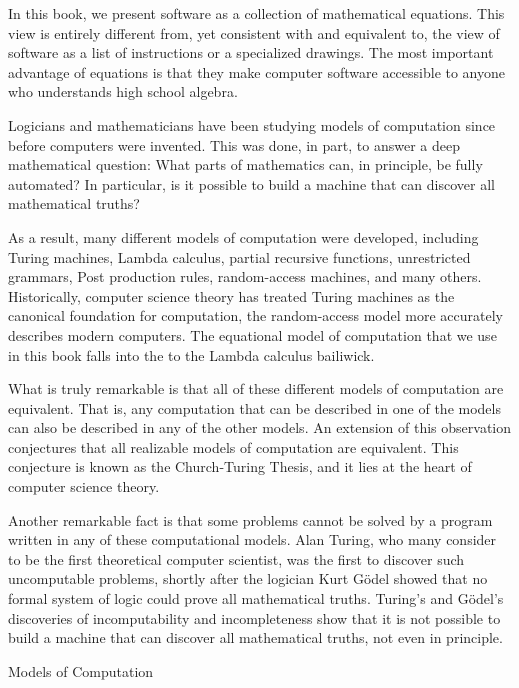 In this book, we present software as a collection of mathematical
equations.  This view is entirely different from, yet consistent with
and equivalent to, the view of
software as a list of instructions or a specialized drawings. 
The most important advantage of equations is that they make computer software accessible to anyone who understands high school algebra.

\begin{aside}
Logicians and mathematicians have been studying models of computation
since before computers were invented. This was done, in part, to
answer a deep mathematical question: What parts of mathematics can,
in principle, be fully automated?  In particular, is it possible to
build a machine that can discover all mathematical truths?

As a result, many different models of computation were developed,
including Turing machines, Lambda calculus, partial recursive
functions, unrestricted grammars, Post production rules, random-access
machines, and many others.  Historically, computer science theory has
treated Turing machines as the canonical foundation for computation,
the random-access model more accurately describes modern computers.  
The equational model of computation that we use in this book falls 
into the to the Lambda calculus bailiwick.

What is truly remarkable is that all of these different models of
computation are equivalent.  That is,
any computation that can be described in one of the models can also
be described in any of the other models.  An extension of this observation 
conjectures that all realizable models
of computation are equivalent.  This conjecture is known as the
Church-Turing Thesis, and it lies at the heart of computer science
theory.

Another remarkable fact is that some problems cannot be solved by a program
written in any of these computational models. Alan
Turing, who many consider to be the first theoretical computer
scientist, was the first to discover such uncomputable problems,
shortly after the logician Kurt G\"odel showed that no formal system
of logic could prove all mathematical truths.  Turing's and G\"odel's
discoveries of incomputability and incompleteness show that it is
not possible to build a machine that can discover all mathematical
truths, not even in principle.

\caption{Models of Computation}
\label{aside-model-of-computation}
\end{aside}

